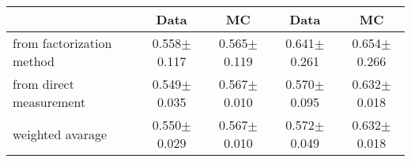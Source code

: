 \begin{table}[hbtp]
\begin{tabular}{l| c c| c c }
    \hline
    & Data & MC & Data & MC \\ 

    \hline
        from factorization method       &  0.558$\pm$0.117  &  0.565$\pm$0.119      &  0.641$\pm$0.261 &   0.654$\pm$0.266    \\
        from direct measurement       &  0.549$\pm$0.035  &  0.567$\pm$0.010      &  0.570$\pm$0.095 &   0.632$\pm$0.018    \\
        weighted avarage       &  0.550$\pm$0.029  &  0.567$\pm$0.010      &  0.572$\pm$0.049 &   0.632$\pm$0.018    \\


  \end{tabular}
\end{table}


